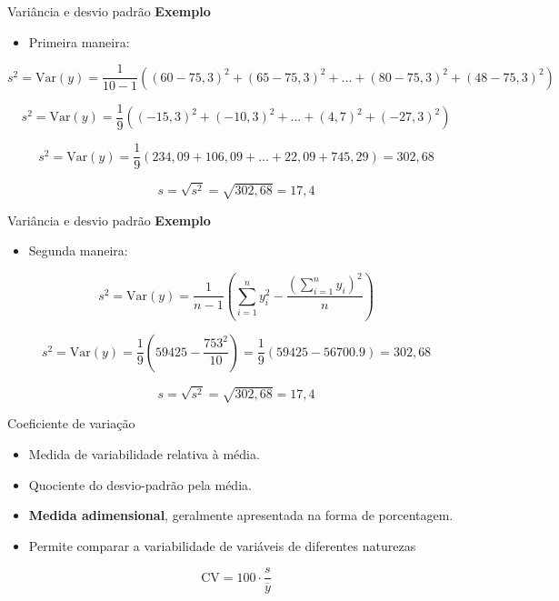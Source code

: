 \documentclass[
  ignorenonframetext,
  serif,
  professionalfont,
  usenames,
  dvipsnames,
  aspectratio = 169]{beamer}
\providecommand{\tightlist}{%
  \setlength{\itemsep}{0pt}\setlength{\parskip}{0pt}}
\renewcommand{\tightlist}{%
  \setlength{\itemsep}{0\baselineskip}
  \setlength{\parskip}{0.25\baselineskip}
}
\begin{document}
\begin{frame}{Variância e desvio padrão}
\label{variuxe2ncia-e-desvio-padruxe3o-1}
\textbf{Exemplo}

\begin{itemize}
\tightlist
\item
  Primeira maneira:
\end{itemize}

\[
s^2 = \textrm{Var}(y) = \frac{1}{10 - 1} \left ( (60 - 75,3)^2 + (65 - 75,3)^2 + ... + (80 - 75,3)^2 + (48 - 75,3)^2   \right )
\]

\[
s^2 = \textrm{Var}(y) = \frac{1}{9} \left ( (-15,3)^2 + (-10,3)^2 + ... + (4,7)^2 + (-27,3)^2   \right )
\]

\[
s^2 = \textrm{Var}(y) = \frac{1}{9} \left ( 234,09 + 106,09 + ... + 22,09 + 745,29 \right ) = 302,68
\]

\[ s = \sqrt{s^2} = \sqrt{302,68} = 17,4\]
\end{frame}

\begin{frame}{Variância e desvio padrão}
\label{variuxe2ncia-e-desvio-padruxe3o-2}
\textbf{Exemplo}

\begin{itemize}
\tightlist
\item
  Segunda maneira:
\end{itemize}

\[
s^2 = \textrm{Var}(y) = \frac{1}{n - 1}\left(\sum_{i = 1}^{n} y_i^2 - \frac{(\sum_{i = 1}^{n} y_i)^2}{n}\right)
\]

\[
s^2 = \textrm{Var}(y) = \frac{1}{9}\left(59425
 - \frac{753^2}{10}\right) = \frac{1}{9}\left(59425
 - 56700.9\right) = 302,68
\]

\[ s = \sqrt{s^2} = \sqrt{302,68} = 17,4\]
\end{frame}

\begin{frame}{Coeficiente de variação}
\label{coeficiente-de-variauxe7uxe3o}
\begin{itemize}
\tightlist
\item
  Medida de variabilidade relativa à média.
\item
  Quociente do desvio-padrão pela média.
\item
  \textbf{Medida adimensional}, geralmente apresentada na forma de
  porcentagem.
\item
  Permite comparar a variabilidade de variáveis de diferentes naturezas
\end{itemize}

\[
\textrm{CV} = 100 \cdot \frac{s}{\overline{y}}
\]
\end{frame}
\end{document}
